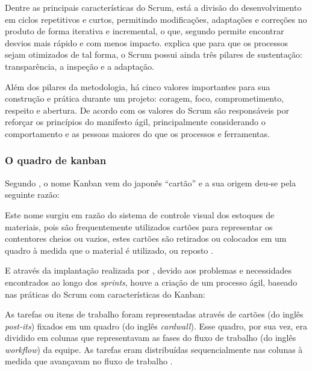 Dentre as principais características do Scrum, está a divisão do desenvolvimento em ciclos repetitivos e curtos, permitindo modificações, adaptações e correções no produto de forma iterativa e incremental, o que, segundo  permite encontrar desvios mais rápido e com menos impacto.  explica que para que os processos sejam otimizados de tal forma, o Scrum possui ainda três pilares de sustentação: transparência, a inspeção e a adaptação.

Além dos pilares da metodologia, há cinco valores importantes para sua construção e prática durante um projeto: coragem, foco, comprometimento, respeito e abertura.  De acordo com  os valores do Scrum são responsáveis por reforçar os princípios do manifesto ágil, principalmente considerando o comportamento e as pessoas maiores do que os processos e ferramentas. 

\subsubsection{O quadro de kanban}
Segundo , o nome Kanban vem do japonês ``cartão'' e a sua origem deu-se pela seguinte razão:

\begin{citacao}
Este nome surgiu em razão do sistema de controle visual dos estoques de materiais, pois são frequentemente utilizados cartões para representar os contentores cheios ou vazios, estes cartões são retirados ou colocados em um quadro à medida que o material é utilizado, ou reposto
\cite{peinado2007compreendendo}.
\end{citacao}

E através da implantação realizada por , devido aos problemas e necessidades encontrados ao longo dos \textsl{sprints}, houve a criação de um processo ágil, baseado nas práticas do Scrum com características do Kanban:

\begin{citacao}
As tarefas ou itens de trabalho foram representadas através de cartões (do inglês \textsl{post-its}) fixados em um quadro (do inglês \textsl{cardwall}). 
Esse quadro, por sua vez, era dividido em colunas que representavam as fases do fluxo de trabalho (do inglês \textsl{workflow}) da equipe. 
As tarefas eram distribuídas sequencialmente nas colunas à medida que avançavam no fluxo de trabalho \cite{silva2012beneficios}.
\end{citacao}

